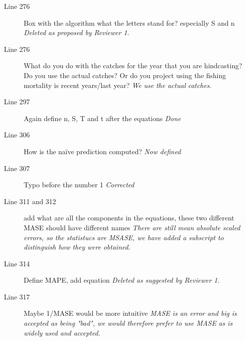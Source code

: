 \begin{itemize}
\begin{description}
\item[Line 276] Box with the algorithm what the letters stand for? especially S and n
\textit{\newline Deleted as proposed by Reviewer 1.}

\item[Line 276] What do you do with the catches for the year that you are hindcasting? Do you use the actual catches? Or do you project using the fishing mortality is recent years/last year?
\textit{\newline We use the actual catches.}

\item[Line 297] Again define n, S, T and t after the equations  
\textit{\newline Done}

\item[Line 306] How is the na\"{i}ve prediction computed?
\textit{\newline Now defined}

\item[Line 307] Typo before the number 1 
\textit{\newline Corrected}

\item[Line 311 and 312] add what are all the components in the equations, these two different MASE should have different names
\textit{\newline There are still mean absolute scaled errors, so the statistucs are MSASE, we have added a subscript to distinguish how they were obtained.}

\item[Line 314] Define MAPE, add equation
\textit{\newline Deleted as suggested by Reviewer 1.}

\item[Line 317] Maybe 1/MASE would be more intuitive
\textit{\newline %
MASE is an error and big is accepted as being "bad", we would therefore prefer to use MASE as is widely used and accepted.}


\end{description}
\end{itemize}
